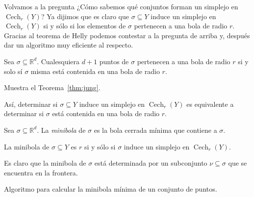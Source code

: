 \documentclass{standalone}
\begin{document}
	Volvamos a la pregunta ¿Cómo sabemos qué conjuntos forman un simplejo en $\operatorname{Cech}_{r}(Y)$? Ya dijimos que es claro que $\sigma\subseteq Y$ induce un simplejo en $\operatorname{Cech}_{r}(Y)$ si y sólo si los elementos de $\sigma$ pertenecen a una bola de radio $r$. Gracias al teorema de Helly podemos contestar a la pregunta de arriba y, después dar un algoritmo muy eficiente al respecto.
	
	\begin{theorem}\label{thm:jung}
		Sea $\sigma\subseteq\mathbb{R}^{d}$. Cualesquiera $d+1$ puntos de $\sigma$ pertenecen a una bola de radio $r$ si y solo sí $\sigma$ misma está contenida en una bola de radio $r$.
	\end{theorem}
	
	\begin{exercise}
		Muestra el Teorema~\ref{thm:jung}.
	\end{exercise}
	
	Así, determinar si $\sigma\subseteq Y$ induce un simplejo en $\operatorname{Cech}_{r}(Y)$ es equivalente a determinar si $\sigma$ está contenida en una bola de radio $r$.
	
	\begin{definition}\label{def:miniball}
		Sea $\sigma\subseteq\mathbb{R}^{d}$. La \emph{minibola} de $\sigma$ es la bola cerrada mínima que contiene a $\sigma$.
	\end{definition}
	
	\begin{exercise}
		La minibola de $\sigma\subseteq Y$ es $r$ si y sólo si $\sigma$ induce un simplejo en $\operatorname{Cech}_{r}(Y)$.
	\end{exercise}
	
	Es claro que la minibola de $\sigma$ está determinada por un subconjunto $\nu\subseteq\sigma$ que se encuentra en la frontera. 
	
	\begin{algorithm}
		\DontPrintSemicolon
		\caption{Algoritmo para calcular la minibola mínima de un conjunto de puntos.}
	\end{algorithm}
	
\end{document}
